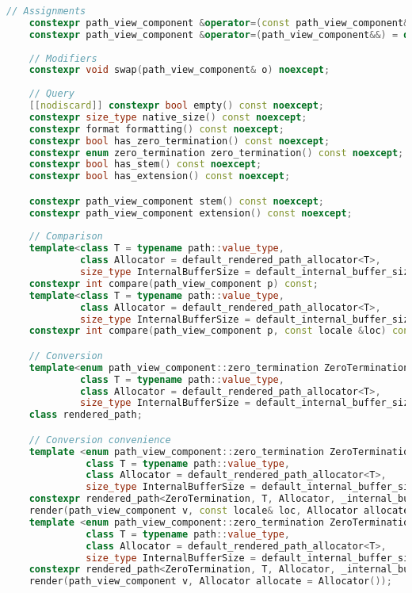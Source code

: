 \documentclass[11pt]{article}
\begin{document}
\begin{lstlisting}[language=cpp]
    // Assignments
    constexpr path_view_component &operator=(const path_view_component&) = default;
    constexpr path_view_component &operator=(path_view_component&&) = default;
    
    // Modifiers
    constexpr void swap(path_view_component& o) noexcept;
    
    // Query
    [[nodiscard]] constexpr bool empty() const noexcept;
    constexpr size_type native_size() const noexcept;
    constexpr format formatting() const noexcept;
    constexpr bool has_zero_termination() const noexcept;
    constexpr enum zero_termination zero_termination() const noexcept;
    constexpr bool has_stem() const noexcept;
    constexpr bool has_extension() const noexcept;

    constexpr path_view_component stem() const noexcept;
    constexpr path_view_component extension() const noexcept;
    
    // Comparison
    template<class T = typename path::value_type,
             class Allocator = default_rendered_path_allocator<T>,
             size_type InternalBufferSize = default_internal_buffer_size>
    constexpr int compare(path_view_component p) const;
    template<class T = typename path::value_type,
             class Allocator = default_rendered_path_allocator<T>,
             size_type InternalBufferSize = default_internal_buffer_size>
    constexpr int compare(path_view_component p, const locale &loc) const;

    // Conversion
    template<enum path_view_component::zero_termination ZeroTermination,
             class T = typename path::value_type,
             class Allocator = default_rendered_path_allocator<T>,
             size_type InternalBufferSize = default_internal_buffer_size>
    class rendered_path;

    // Conversion convenience
    template <enum path_view_component::zero_termination ZeroTermination,
              class T = typename path::value_type,
              class Allocator = default_rendered_path_allocator<T>,
              size_type InternalBufferSize = default_internal_buffer_size>
    constexpr rendered_path<ZeroTermination, T, Allocator, _internal_buffer_size>
    render(path_view_component v, const locale& loc, Allocator allocate = Allocator());
    template <enum path_view_component::zero_termination ZeroTermination,
              class T = typename path::value_type,
              class Allocator = default_rendered_path_allocator<T>,
              size_type InternalBufferSize = default_internal_buffer_size>
    constexpr rendered_path<ZeroTermination, T, Allocator, _internal_buffer_size>
    render(path_view_component v, Allocator allocate = Allocator());


\end{lstlisting}
\end{document}
